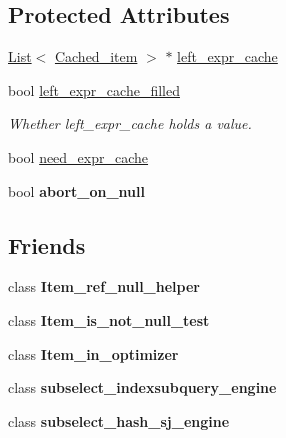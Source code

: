 \subsection*{Protected Attributes}
\begin{DoxyCompactItemize}
\item 
\mbox{\hyperlink{classList}{List}}$<$ \mbox{\hyperlink{classCached__item}{Cached\+\_\+item}} $>$ $\ast$ \mbox{\hyperlink{classItem__in__subselect_a8bbfa3f7c6c193f4f1a0765419c60414}{left\+\_\+expr\+\_\+cache}}
\item 
\mbox{\label{classItem__in__subselect_af994674268fe8e58ad87cab1e1f8c2ea}} 
bool \mbox{\hyperlink{classItem__in__subselect_af994674268fe8e58ad87cab1e1f8c2ea}{left\+\_\+expr\+\_\+cache\+\_\+filled}}
\begin{DoxyCompactList}\small\item\em Whether left\+\_\+expr\+\_\+cache holds a value. \end{DoxyCompactList}\item 
bool \mbox{\hyperlink{classItem__in__subselect_a33b13f3f53fb842de54a042f0e467976}{need\+\_\+expr\+\_\+cache}}
\item 
\mbox{\label{classItem__in__subselect_a48152c490f28cad1ea9bcb22f1b71a07}} 
bool {\bfseries abort\+\_\+on\+\_\+null}
\end{DoxyCompactItemize}
\subsection*{Friends}
\begin{DoxyCompactItemize}
\item 
\mbox{\label{classItem__in__subselect_a59a757b56feedc3f33cf5e5002d9cec7}} 
class {\bfseries Item\+\_\+ref\+\_\+null\+\_\+helper}
\item 
\mbox{\label{classItem__in__subselect_a22ec062ef581c11539c47870475215e4}} 
class {\bfseries Item\+\_\+is\+\_\+not\+\_\+null\+\_\+test}
\item 
\mbox{\label{classItem__in__subselect_a6d0c03141d3908698d518f2e65c89b2e}} 
class {\bfseries Item\+\_\+in\+\_\+optimizer}
\item 
\mbox{\label{classItem__in__subselect_ab4ad88114d3bced9f04b989f73b27711}} 
class {\bfseries subselect\+\_\+indexsubquery\+\_\+engine}
\item 
\mbox{\label{classItem__in__subselect_a2f66e198b4494e15b3cbe1a83fea8022}} 
class {\bfseries subselect\+\_\+hash\+\_\+sj\+\_\+engine}
\end{DoxyCompactItemize}
